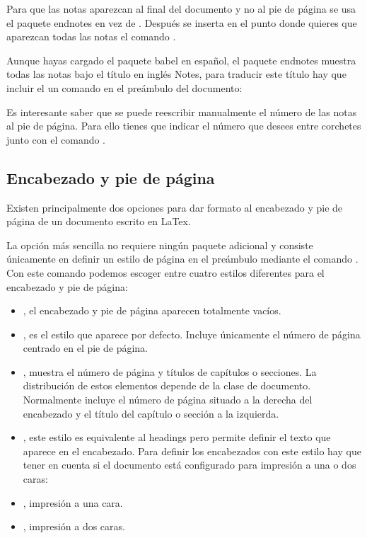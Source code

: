\documentclass[11pt, a4paper]{article}
\begin{document}
Para que las notas aparezcan al final del documento y no al pie de página se usa el paquete endnotes en vez de . Después se inserta en el punto donde quieres que aparezcan todas las notas el comando .

Aunque hayas cargado el paquete babel en español, el paquete endnotes muestra todas las notas bajo el título en inglés Notes, para traducir este título hay que incluir el un comando en el preámbulo del documento: 

Es interesante saber que se puede reescribir manualmente el número de las notas al pie de página. Para ello tienes que indicar el número que desees entre corchetes junto con el comando .

\subsection{Encabezado y pie de página}

Existen principalmente dos opciones para dar formato al encabezado y pie de página de un documento escrito en LaTex.

La opción más sencilla no requiere ningún paquete adicional y consiste únicamente en definir un estilo de página en el preámbulo mediante el comando . Con este comando podemos escoger entre cuatro estilos diferentes para el encabezado y pie de página:
\begin{itemize}
\item {}, el encabezado y pie de página aparecen totalmente vacíos.

\item {}, es el estilo que aparece por defecto. Incluye únicamente el número de página centrado en el pie de página.

\item {}, muestra el número de página y títulos de capítulos o secciones. La distribución de estos elementos depende de la clase de documento. Normalmente incluye el número de página situado a la derecha del encabezado y el título del capítulo o sección a la izquierda.

\item {}, este estilo es equivalente al headings pero permite definir el texto que aparece en el encabezado. Para definir los encabezados con este estilo hay que tener en cuenta si el documento está configurado para impresión a una o dos caras:

\item {}, impresión a una cara.

\item {}, impresión a dos caras.
\end{itemize}
\end{document}
